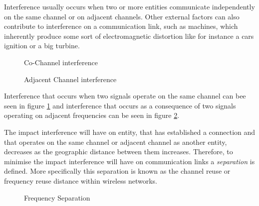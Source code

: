 Interference usually occurs when two or more entities communicate independently on the same channel or on adjacent channels\cite{WirelessCommunications,WirelessDigitalCommunications}. Other external factors can also contribute to interference on a communication link, such as machines, which inherently produce some sort of electromagnetic distortion like for instance a cars ignition or a big turbine\cite{WirelessCommunications,WirelessDigitalCommunications}. 
\begin{figure}[t!]
	\begin{centering}
	
	\label{fig:sameinterference}
	\caption{Co-Channel interference}
	\end{centering}
\end{figure}

\begin{figure}[bp!]
	\begin{centering}
	
	\label{fig:adjacentinterference}
	\caption{Adjacent Channel interference}
	\end{centering}
\end{figure}
Interference that occurs when two signals operate on the same channel can bee seen in figure \ref{fig:sameinterference} and interference that occurs as a consequence of two signals operating on adjacent frequencies can be seen in figure \ref{fig:adjacentinterference}.

The impact interference will have on entity, that has established a connection and that operates on the same channel or adjacent channel as another entity, decreases as the geographic distance between them increases\cite{WirelessCommunications,WirelessDigitalCommunications,Eisenblatter,InterferenceOrientatedFAP}. Therefore, to minimise the impact interference will have on communication links a \emph{separation} is defined\cite{WirelessCommunications,WirelessDigitalCommunications,Eisenblatter,InterferenceOrientatedFAP}. More specifically this separation is known as the channel reuse or frequency reuse distance within wireless networks\cite{WirelessCommunications,WirelessDigitalCommunications,Eisenblatter,InterferenceOrientatedFAP}.

\begin{figure}[t!]
	\begin{centering}
	
	\caption{Frequency Separation}
	\label{fig:seperationgraph}
	\end{centering}
\end{figure}

